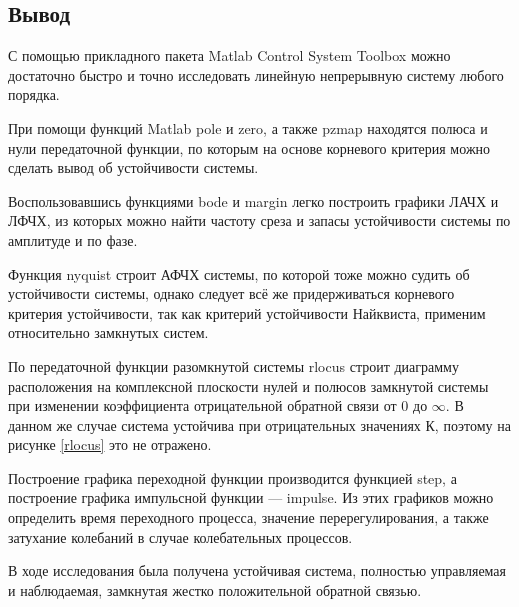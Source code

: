 \documentclass[a4paper,12pt]{article} %
\begin{document}
\newpage
\begin{center}
	\section*{Вывод}
\end{center}
С помощью прикладного пакета Matlab Control System Toolbox можно достаточно быстро и точно исследовать линейную непрерывную систему любого порядка.\par
При помощи функций Matlab pole и zero, а также pzmap находятся полюса и нули передаточной функции, по которым на основе корневого критерия можно сделать вывод об устойчивости системы.\par
Воспользовавшись функциями bode и margin легко построить графики ЛАЧХ и ЛФЧХ, из которых можно найти частоту среза и запасы устойчивости системы по амплитуде и по фазе.\par
Функция nyquist строит АФЧХ системы, по которой тоже можно судить об устойчивости системы, однако следует всё же придерживаться корневого критерия устойчивости, так как критерий устойчивости Найквиста, применим относительно замкнутых систем.\par
По передаточной функции разомкнутой системы rlocus строит диаграмму расположения на комплексной плоскости нулей и полюсов замкнутой системы при изменении коэффициента отрицательной обратной связи
от 0 до $\infty$. В данном же случае система устойчива при отрицательных значениях К, поэтому на рисунке \ref{rlocus} это не отражено.\par
Построение графика переходной функции производится функцией step, а построение графика импульсной функции --- impulse. Из этих графиков можно определить время переходного процесса, значение перерегулирования, а также затухание колебаний в случае колебательных процессов.\par
В ходе исследования была получена устойчивая система, полностью управляемая и наблюдаемая, замкнутая жестко положительной обратной связью.
\end{document}
